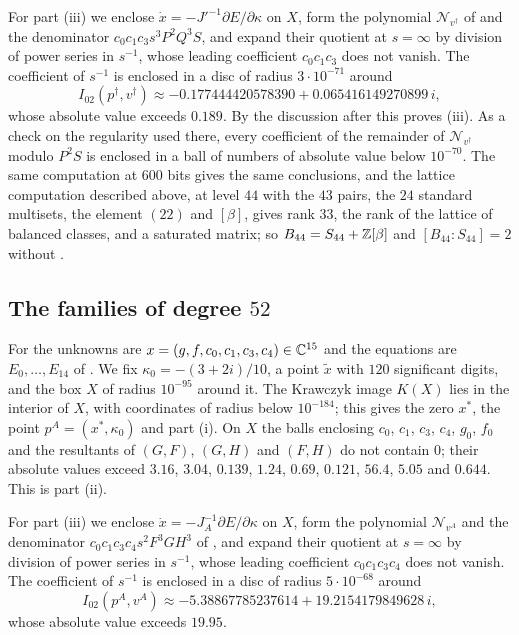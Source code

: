 For part (iii) we enclose $\dot x=-J'^{-1}\partial E/\partial\kappa$ on $X$,
form the polynomial $\mathcal N_{v^{\dagger}}$ of  and
the denominator $c_{0}c_{1}c_{3}s^{3}P^{2}Q^{3}S$, and expand their quotient
at $s=\infty$ by division of power series in $s^{-1}$, whose leading
coefficient $c_{0}c_{1}c_{3}$ does not vanish. The coefficient of $s^{-1}$ is
enclosed in a disc of radius $3\cdot10^{-71}$ around
\[
  I_{02}(p^{\dagger},v^{\dagger})\approx-0.177444420578390+0.065416149270899\,i,
\]
whose absolute value exceeds $0.189$. By the discussion after
 this proves (iii). As a check on the regularity used
there, every coefficient of the remainder of $\mathcal N_{v^{\dagger}}$
modulo $P^{2}S$ is enclosed in a ball of numbers of absolute value below
$10^{-70}$. The same
computation at $600$ bits gives the same conclusions, and the lattice
computation described above, at level $44$ with the $43$ pairs, the $24$
standard multisets, the element $(22)$ and $[\beta]$, gives rank $33$, the
rank of the lattice of balanced classes, and a saturated matrix; so
$B_{44}=S_{44}+\mathbb{Z}[\beta]$ and $[B_{44}:S_{44}]=2$ without .

\subsection*{The families of degree \texorpdfstring{$52$}{52}}
For  the unknowns are $x=(g,f,c_{0},c_{1},c_{3},c_{4})
\in\mathbb{C}^{15}$ and the equations are $E_{0},\dots,E_{14}$ of
. We fix $\kappa_{0}=-(3+2i)/10$, a point $\tilde x$
with $120$ significant digits, and the box $X$ of radius $10^{-95}$ around
it. The Krawczyk image $K(X)$ lies in the interior of $X$, with coordinates
of radius below $10^{-184}$; this gives the zero $x^{*}$, the point
$p^{A}=(x^{*},\kappa_{0})$ and part (i). On $X$ the balls enclosing $c_{0}$,
$c_{1}$, $c_{3}$, $c_{4}$, $g_{0}$, $f_{0}$ and the resultants of $(G,F)$,
$(G,H)$ and $(F,H)$ do not contain $0$; their absolute values exceed $3.16$,
$3.04$, $0.139$, $1.24$, $0.69$, $0.121$, $56.4$, $5.05$ and $0.644$. This
is part (ii).

For part (iii) we enclose $\dot x=-J_{A}^{-1}\partial E/\partial\kappa$ on
$X$, form the polynomial $\mathcal N_{v^{A}}$ and the denominator
$c_{0}c_{1}c_{3}c_{4}s^{2}F^{3}GH^{3}$ of , and expand
their quotient at $s=\infty$ by division of power series in $s^{-1}$, whose
leading coefficient $c_{0}c_{1}c_{3}c_{4}$ does not vanish. The coefficient
of $s^{-1}$ is enclosed in a disc of radius $5\cdot10^{-68}$ around
\[
  I_{02}(p^{A},v^{A})\approx-5.38867785237614+19.2154179849628\,i,
\]
whose absolute value exceeds $19.95$.

